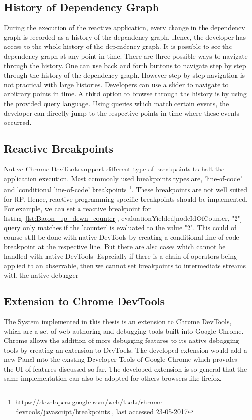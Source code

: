 \subsection{History of Dependency Graph}

During the execution of the reactive application, every change in the dependency graph is recorded as a history of the dependency graph. Hence, the developer has access to the whole history of the
dependency graph. It is possible to see the dependency graph at any point in time. There are three possible ways to navigate through the history. One can use back and forth buttons to navigate step by step through the history of the dependency graph. However step-by-step navigation is not practical with large histories. Developers can use a slider to navigate to arbitrary points in time. A third option to browse through the history is by using the provided query language. Using queries which match certain events, the developer can directly jump to the respective points in time where these events occurred.

\subsection{Reactive Breakpoints}
Native Chrome DevTools support different type of breakpoints to halt the application execution. Most commonly used breakpoints types are, 'line-of-code' and 'conditional line-of-code'
breakpoints \footnote{\url{https://developers.google.com/web/tools/chrome-devtools/javascript/breakpoints} , last accessed 23-05-2017}. These breakpoints are not well suited for RP. Hence, reactive-programming-specific breakpoints should be implemented.
For example, we can set a reactive breakpoint for listing~\ref{lst:Bacon_up_down_counter}, evaluationYielded[nodeIdOfCounter, "2"] query only matches if the 'counter' is evaluated to the value "2".
This could of course still be done with native DevTools by creating a conditional line-of-code breakpoint at the respective line. But there are also cases which cannot be handled with native DevTools. 
Especially if there is a chain of operators being applied to an observable, then we cannot set breakpoints to intermediate streams with the native debugger.

\subsection{Extension to Chrome DevTools}
The System implemented in this thesis is an extension to Chrome DevTools, which are a set of web authoring and debugging tools built into Google Chrome. Chrome allows the addition of more debugging features to its native debugging tools by creating an extension to DevTools. The developed extension would add a new Panel into the existing Developer Tools of Google Chrome which provides the UI of features discussed so far. The developed extension is so general that the same implementation can also be adopted for others browsers like firefox.


